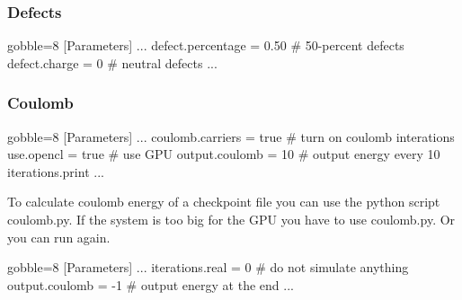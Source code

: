     \subsubsection{Defects}
    \begin{bashcode*}{gobble=8}
        [Parameters]
        ...
        defect.percentage       = 0.50 # 50-percent defects
        defect.charge           = 0    # neutral defects
        ...
    \end{bashcode*}

    \subsubsection{Coulomb}
    \begin{bashcode*}{gobble=8}
        [Parameters]
        ...
        coulomb.carriers        = true # turn on coulomb interations
        use.opencl              = true # use GPU
        output.coulomb          = 10   # output energy every 10 iterations.print
        ...
    \end{bashcode*}
    To calculate coulomb energy of a checkpoint file you can use the
        python script coulomb.py.
    If the system is too big for the GPU you have to use coulomb.py.
    Or you can run \langmuir again.
    \begin{bashcode*}{gobble=8}
        [Parameters]
        ...
        iterations.real         =  0 # do not simulate anything
        output.coulomb          = -1 # output energy at the end
        ...
    \end{bashcode*}    
    